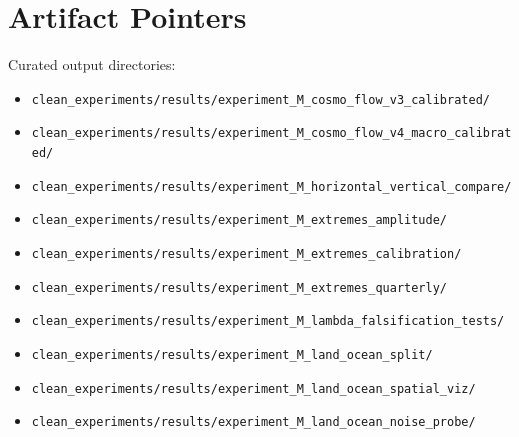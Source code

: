 \documentclass[11pt]{article}
\begin{document}
\section{Artifact Pointers}
Curated output directories:
\begin{itemize}
  \item \texttt{clean\_experiments/results/experiment\_M\_cosmo\_flow\_v3\_calibrated/}
  \item \texttt{clean\_experiments/results/experiment\_M\_cosmo\_flow\_v4\_macro\_calibrated/}
  \item \texttt{clean\_experiments/results/experiment\_M\_horizontal\_vertical\_compare/}
  \item \texttt{clean\_experiments/results/experiment\_M\_extremes\_amplitude/}
  \item \texttt{clean\_experiments/results/experiment\_M\_extremes\_calibration/}
  \item \texttt{clean\_experiments/results/experiment\_M\_extremes\_quarterly/}
  \item \texttt{clean\_experiments/results/experiment\_M\_lambda\_falsification\_tests/}
  \item \texttt{clean\_experiments/results/experiment\_M\_land\_ocean\_split/}
  \item \texttt{clean\_experiments/results/experiment\_M\_land\_ocean\_spatial\_viz/}
  \item \texttt{clean\_experiments/results/experiment\_M\_land\_ocean\_noise\_probe/}
\end{itemize}
\end{document}
